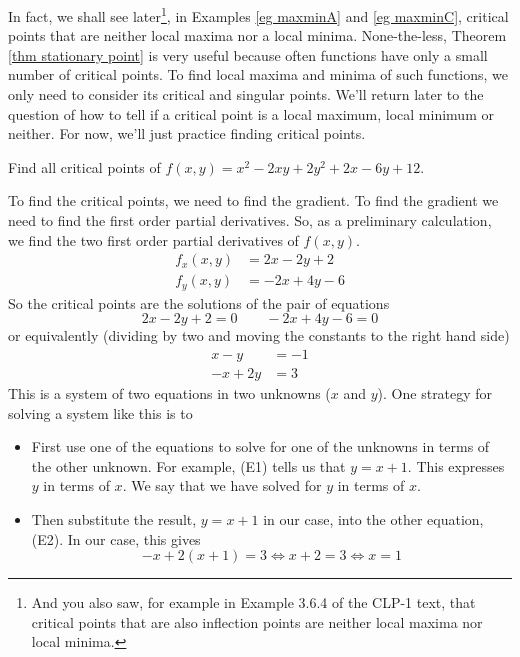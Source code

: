 In fact, we shall see later\footnote{And you also saw, for example in
Example 3.6.4 of the CLP-1 text, that critical points that are also
inflection points are neither local maxima nor local minima.}, 
in Examples \ref{eg maxminA} and 
\ref{eg maxminC}, critical points that are neither local maxima nor a local minima. None-the-less, 
Theorem \ref{thm stationary point} is very useful because often functions have
only a small number of critical points. To find local maxima and minima
of such functions, we only need to consider its critical and singular
points. We'll return later to the question of how to tell if a 
critical point is a local maximum, local minimum or neither. For now, 
we'll just practice finding critical points. 

\begin{eg}[$f(x,y)=x^2-2xy+2y^2+2x-6y+12$]\label{eg:MXMNlocalA}
Find all critical points of $f(x,y)=x^2-2xy+2y^2+2x-6y+12$.

\soln
To find the critical points, we need to find the gradient. To find the 
gradient we need to find the first order partial derivatives.
So, as a preliminary calculation, we find the two first order
partial derivatives of $f(x,y)$.
\begin{align*}
f_x(x,y)&= 2x-2y+2 \\
f_y(x,y)&= -2x+4y-6 
\end{align*}
So the critical points are the solutions of the pair of equations
\begin{equation*}
2x-2y+2=0\qquad -2x+4y-6=0
\end{equation*} 
or equivalently (dividing by two and moving the constants to the 
right hand side)
\begin{subequations}\label{eq:MXMNlocalA}
\begin{align*}
x-y&=-1 \tag{E1}\\
-x+2y&=3 \tag{E2}
\end{align*}
\end{subequations}
This is a system of two equations in two unknowns ($x$ and $y$).
One strategy for solving a system like this is to 
\begin{itemize}
\item First use one of the equations to solve for one of the unknowns
in terms of the other unknown. For example, (E1) tells
us that $y= x+1$. This expresses $y$ in terms of $x$. We say that we have
solved for $y$ in terms of $x$.

\item Then substitute the result, $y= x+1$ in our case, into the
other equation, (E2). In our case, this gives
\begin{equation*}
-x+2(x+1)=3
\iff x+2=3
\iff x=1
\end{equation*} 


\end{itemize}
\end{eg}
